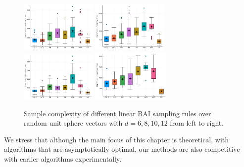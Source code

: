 \begin{figure}[ht]
 \centering
 \includegraphics[clip, width= 0.33\textwidth]{Chapter4/img/bai_dim_6}
 \includegraphics[clip, width= 0.33\textwidth]{Chapter4/img/bai_dim_8}
 \includegraphics[clip, width= 0.33\textwidth]{Chapter4/img/bai_dim_10}
 \includegraphics[clip, width= 0.34\textwidth]{Chapter4/img/bai_dim_12}
 \caption{Sample complexity of different linear BAI sampling rules over random unit sphere vectors with $d=6, 8, 10, 12$ from left to right.}
 \label{fig:sample_complexity_2}
\end{figure}

We stress that although the main focus of this chapter is theoretical, with algorithms that are asymptotically optimal, our methods are also competitive with earlier algorithms experimentally.
